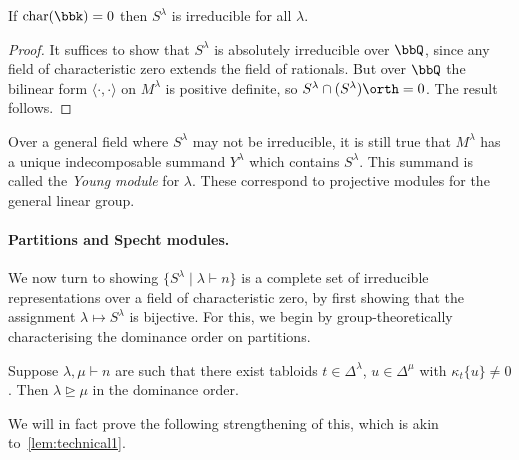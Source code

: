 \begin{corollary}
    If $\textnormal{char}(\bbk)=0$ then $S^\lambda$ is irreducible for all
    $\lambda$.

    \begin{proof}
        It suffices to show that $S^\lambda$ is absolutely irreducible over
        $\bbQ$, since any field of characteristic zero extends the field of
        rationals. But over $\bbQ$ the bilinear form $\langle \cdot, \cdot
        \rangle$ on $M^\lambda$ is positive definite, so $S^\lambda\cap
        (S^\lambda)\orth = 0$. The result follows.
    \end{proof}
\end{corollary}

\begin{remark}
    Over a general field where $S^\lambda$ may not be irreducible, it is still
    true that $M^\lambda$ has a unique indecomposable summand $Y^\lambda$ which
    contains $S^\lambda$. This summand is called the \emph{Young module} for
    $\lambda$. These correspond to projective modules for the general linear
    group.
\end{remark}

\paragraph{Partitions and Specht modules.} We now turn to showing $\{S^\lambda\;|\; \lambda\vdash n\}$ is a
complete set of irreducible representations over a field of characteristic zero,
by first showing that the assignment $\lambda\mapsto S^\lambda$ is bijective.
For this, we begin by group-theoretically characterising the dominance order on partitions.

\begin{proposition}
    \label{prop:dominancecharacterisation}
    Suppose $\lambda,\mu\vdash n$ are such that there exist tabloids $t\in
    \Delta^\lambda$, $u\in \Delta^\mu$ with $\kappa_t\{u\}\neq 0$. Then
    $\lambda \unrhd \mu$ in the dominance order.
\end{proposition}

We will in fact prove the following strengthening of this, which is akin
to~\cref{lem:technical1}. 

